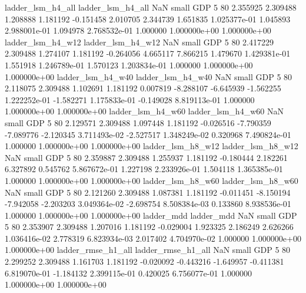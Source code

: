        ladder_lsm_h4_all        ladder_lsm_h4_all                   NaN      small      GDP                 5 80 2.355925       2.309488 1.208888       1.181192   -0.151458      2.010705      2.344739     1.651835   1.025377e-01  1.045893 2.988001e-01     1.094978   2.768532e-01            1.000000    1.000000e+00        1.000000e+00
       ladder_lsm_h4_w12        ladder_lsm_h4_w12                   NaN      small      GDP                 5 80 2.417229       2.309488 1.274107       1.181192   -0.264056      4.665117      7.866215     1.479670   1.429381e-01  1.551918 1.246789e-01     1.570123   1.203834e-01            1.000000    1.000000e+00        1.000000e+00
       ladder_lsm_h4_w40        ladder_lsm_h4_w40                   NaN      small      GDP                 5 80 2.118075       2.309488 1.102691       1.181192    0.007819     -8.288107     -6.645939    -1.562255   1.222252e-01 -1.582271 1.175833e-01    -0.149028   8.819113e-01            1.000000    1.000000e+00        1.000000e+00
       ladder_lsm_h4_w60        ladder_lsm_h4_w60                   NaN      small      GDP                 5 80 2.129571       2.309488 1.097448       1.181192   -0.026516     -7.790359     -7.089776    -2.120345   3.711493e-02 -2.527517 1.348249e-02     0.320968   7.490824e-01            1.000000    1.000000e+00        1.000000e+00
       ladder_lsm_h8_w12        ladder_lsm_h8_w12                   NaN      small      GDP                 5 80 2.359887       2.309488 1.255937       1.181192   -0.180444      2.182261      6.327892     0.545762   5.867672e-01  1.227198 2.233926e-01     1.504118   1.365385e-01            1.000000    1.000000e+00        1.000000e+00
       ladder_lsm_h8_w60        ladder_lsm_h8_w60                   NaN      small      GDP                 5 80 2.121260       2.309488 1.087381       1.181192   -0.011451     -8.150194     -7.942058    -2.203203   3.049364e-02 -2.698754 8.508384e-03     0.133860   8.938536e-01            1.000000    1.000000e+00        1.000000e+00
              ladder_mdd               ladder_mdd                   NaN      small      GDP                 5 80 2.353907       2.309488 1.207016       1.181192   -0.029004      1.923325      2.186249     2.626266   1.036416e-02  2.778319 6.823934e-03     2.017402   4.704970e-02            1.000000    1.000000e+00        1.000000e+00
      ladder_rmse_h1_all       ladder_rmse_h1_all                   NaN      small      GDP                 5 80 2.299252       2.309488 1.161703       1.181192   -0.020092     -0.443216     -1.649957    -0.411381   6.819070e-01 -1.184132 2.399115e-01     0.420025   6.756077e-01            1.000000    1.000000e+00        1.000000e+00
